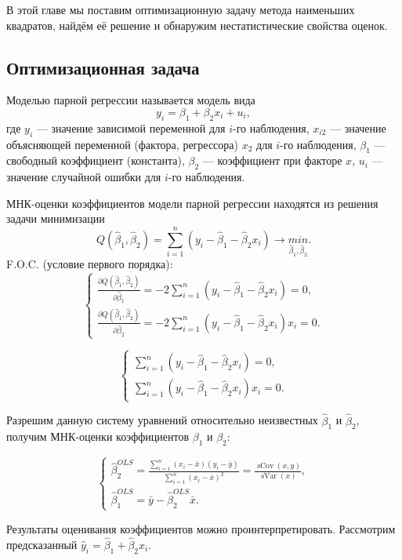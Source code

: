 \documentclass[12pt]{article}
\DeclareMathOperator{\sCov}{sCov}
\DeclareMathOperator{\sVar}{sVar}
\newcommand{\hb}{\hat{\beta}}
\newcommand{\hy}{\hat{y}}
\begin{document}
В этой главе мы поставим оптимизационную задачу метода наименьших квадратов, найдём её решение и обнаружим нестатистические свойства оценок. 

\subsection{Оптимизационная задача}
Моделью парной регрессии называется модель вида
\[
y_i = \beta_1 + \beta_2 x_i + u_i,
\]
где $y_i$ — значение зависимой переменной для $i$-го наблюдения, $x_{i2}$ — значение объясняющей переменной (фактора, регрессора) $x_2$ для $i$-го наблюдения, $\beta_1$ — свободный коэффициент (константа), $\beta_2$ — коэффициент при факторе $x$, $u_i$ — значение случайной ошибки для $i$-го наблюдения.

МНК-оценки коэффициентов модели парной регрессии находятся из решения задачи минимизации
\[
Q(\hb_1, \hb_2) = \sum_{i=1}^n (y_i - \hb_1 - \hb_2 x_i) \to \underset{\hb_1, \hb_2}{min} .
\]
F.O.C. (условие первого порядка):
\begin{equation*}
 \begin{cases}
\frac{\partial Q(\hb_1,\hb_2)}{\partial \hb_1} = -2\sum_{i=1}^n (y_i - \hb_1 - \hb_2 x_i) = 0,
\\
\frac{\partial Q(\hb_1,\hb_2)}{\partial \hb_2} = -2\sum_{i=1}^n (y_i - \hb_1 - \hb_2 x_i)x_i = 0.
 \end{cases}
\end{equation*}

\begin{equation*}
 \begin{cases}
\sum_{i=1}^n (y_i - \hb_1 - \hb_2 x_i) = 0,
\\
\sum_{i=1}^n (y_i - \hb_1 - \hb_2 x_i)x_i = 0.
 \end{cases}
\end{equation*}

Разрешим данную систему уравнений относительно неизвестных $\hb_1$ и $\hb_2$, получим МНК-оценки коэффициентов $\beta_1$ и $\beta_2$:

\begin{equation*}
 \begin{cases}
\hb_2^{OLS} = \frac{\sum_{i=1}^n(x_i - \bar{x})(y_i - \bar{y})}{\sum_{i=1}^n(x_i-\bar{x})^2} = \frac{\sCov(x,y)}{\sVar(x)},
\\
\hb_1^{OLS} = \bar{y} - \hb_2^{OLS}\bar{x}.
 \end{cases}
\end{equation*}

Результаты оценивания коэффициентов можно проинтерпретировать. Рассмотрим предсказанный $\hy_i = \hb_1 + \hb_2 x_i.$
\end{document}
